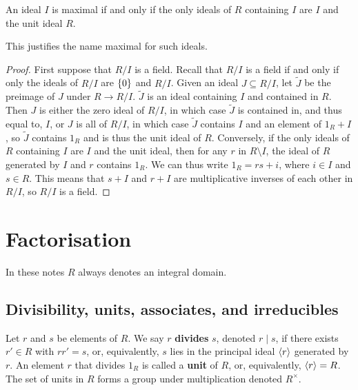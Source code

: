 \begin{lemma}
An ideal $ I $ is maximal if and only if the only ideals of $ R $ containing $ I $ are $ I $ and the unit ideal $ R $.
\end{lemma}

This justifies the name maximal for such ideals.

\begin{proof}
First suppose that $ R / I $ is a field. Recall that $ R / I $ is a field if and only if only the ideals of $ R / I $ are $ \cbr{0} $ and $ R / I $. Given an ideal $ J \subseteq R / I $, let $ \widetilde{J} $ be the preimage of $ J $ under $ R \to R / I $. $ \widetilde{J} $ is an ideal containing $ I $ and contained in $ R $. Then $ J $ is either the zero ideal of $ R / I $, in which case $ \widetilde{J} $ is contained in, and thus equal to, $ I $, or $ J $ is all of $ R / I $, in which case $ \widetilde{J} $ contains $ I $ and an element of $ 1_R + I $, so $ \widetilde{J} $ contains $ 1_R $ and is thus the unit ideal of $ R $. Conversely, if the only ideals of $ R $ containing $ I $ are $ I $ and the unit ideal, then for any $ r $ in $ R \setminus I $, the ideal of $ R $ generated by $ I $ and $ r $ contains $ 1_R $. We can thus write $ 1_R = rs + i $, where $ i \in I $ and $ s \in R $. This means that $ s + I $ and $ r + I $ are multiplicative inverses of each other in $ R / I $, so $ R / I $ is a field.
\end{proof}

\pagebreak

\section{Factorisation}

In these notes $ R $ always denotes an integral domain.

\subsection{Divisibility, units, associates, and irreducibles}

\begin{definition}
Let $ r $ and $ s $ be elements of $ R $. We say $ r $ \textbf{divides} $ s $, denoted $ r \mid s $, if there exists $ r' \in R $ with $ rr' = s $, or, equivalently, $ s $ lies in the principal ideal $ \left\langle r \right\rangle $ generated by $ r $. An element $ r $ that divides $ 1_R $ is called a \textbf{unit} of $ R $, or, equivalently, $ \left\langle r \right\rangle = R $. The set of units in $ R $ forms a group under multiplication denoted $ R^\times $.
\end{definition}

